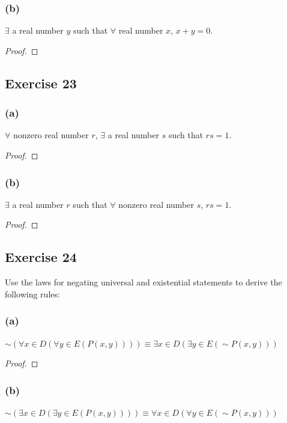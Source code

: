 \documentclass[14pt]{extarticle}
\newcommand{\fa}{\forall}
\newcommand{\te}{\exists}
\begin{document}
\subsubsection{(b)}
$\te$ a real number $y$ such that $\fa$ real number $x$, $x + y = 0$.

\begin{proof}

\end{proof}

\subsection{Exercise 23}
\subsubsection{(a)}
$\fa$ nonzero real number $r$, $\te$ a real number $s$ such that $rs = 1$.

\begin{proof}

\end{proof}

\subsubsection{(b)}
$\te$ a real number $r$ such that $\fa$ nonzero real number $s$, $rs = 1$.

\begin{proof}

\end{proof}

\subsection{Exercise 24}
Use the laws for negating universal and existential statements to derive the following rules:

\subsubsection{(a)}
$\sim(\fa x \in D(\fa y \in E(P(x, y)))) \equiv \te x \in D(\te y \in E({\sim P(x, y)}))$

\begin{proof}

\end{proof}

\subsubsection{(b)}
$\sim(\te x \in D(\te y \in E(P(x, y)))) \equiv \fa x \in D(\fa y \in E({\sim P(x, y)}))$
\end{document}

